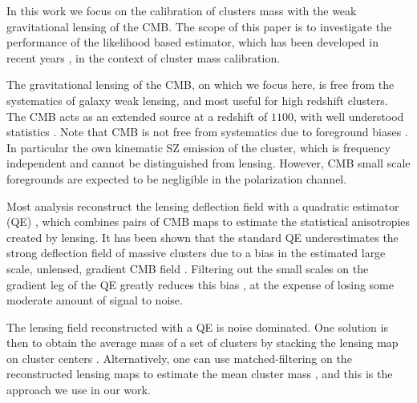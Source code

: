 \documentclass[prd, superscriptaddress, tightenlines, longbibliography, nofootinbib, eqsecnum, amsfonts, amsmath, floatfix, twocolumn, notitlepage]{revtex4-2}
\newcommand{\JC}[1]{\color{purple}{{JC:#1}}\color{black}\xspace}
\newcommand{\LL}[1]{{\color{orange}{LL: #1}}}
\begin{document}
In this work we focus on the calibration of clusters mass with the weak gravitational lensing of the CMB. 
The scope of this paper is to investigate the performance of the likelihood based estimator, which has been developed in recent years \cite{Carron:2017mqf}, in the context of cluster mass calibration. 


The gravitational lensing of the CMB, on which we focus here, is free from the systematics of galaxy weak lensing, and most useful for high redshift clusters. 
The CMB acts as an extended source at a redshift of $1100$, with well understood statistics \cite{Lewis:2006fu}.  
Note that CMB is not free from systematics due to foreground biases \cite{Madhavacheril:2018bxi, DES:2018myw, Patil_2020}. In particular the own kinematic SZ emission of the cluster, which is frequency independent and cannot be distinguished from lensing. However, CMB small scale foregrounds are expected to be negligible in the polarization channel.

Most analysis reconstruct the lensing deflection field with a quadratic estimator (QE) \cite{Hu:2001tn, Hu:2001kj, Okamoto:2003zw, Planck:2018lbu}, which combines pairs of CMB maps to estimate the statistical anisotropies created by lensing. 
It has been shown that the standard QE underestimates the strong deflection field of massive clusters due to a bias in the estimated large scale, unlensed, gradient CMB field \cite{Maturi:2004zj}. Filtering out the small scales on the gradient leg of the QE greatly reduces this bias \cite{Hu:2007bt}, at the expense of losing some moderate amount of signal to noise.

The lensing field reconstructed with a QE is noise dominated. One solution is then to obtain the average mass of a set of clusters by stacking the lensing map on cluster centers \cite{DES:2017fyz, Geach:2017crt, DES:2018myw, ACT:2020izl}. Alternatively, one can use matched-filtering on the reconstructed lensing maps to estimate the mean cluster mass \cite{Melin:2014uaa, Louis:2016gvv, Zubeldia:2019brr}, and this is the approach we use in our work. \JC{How different are these two thing really?} \LL{I think that in the matched filter you need to assume a cluster shape ($\theta_s$) and then measure its the amplitude. When stacking you can fit both shape and amplitude on the staked profile.}
\end{document}
